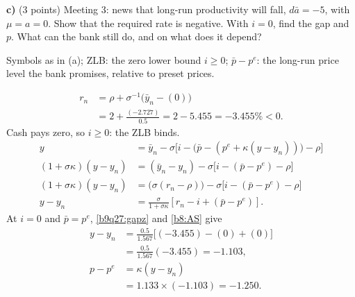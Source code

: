 \textbf{c)} (3 points) Meeting 3: news that long-run productivity will fall, $d\bar a=-5$, with $\mu=a=0$. Show that the required rate is
negative. With $i=0$, find the gap and $p$. What can the bank still do, and on what does it depend?
\resolespaco
\begin{sol}
\begin{notacao}
\item Symbols as in (a); ZLB: the zero lower bound $i\ge0$; $\bar p-p^e$: the long-run price level the bank promises, relative to preset prices.
\end{notacao}
\begin{align*}
r_n&=\rho+\sigma^{-1}\big(\bar y_n-(0)\big)\\
&=2+\frac{(-2.727)}{0.5}=2-5.455=-3.455\%<0 .
\end{align*}
Cash pays zero, so $i\ge0$: the ZLB binds.
\begin{align}
y&=\bar y_n-\sigma\big[i-\big(\bar p-(p^e+\kappa(y-y_n))\big)-\rho\big]\nonumber\\
(1+\sigma\kappa)(y-y_n)&=(\bar y_n-y_n)-\sigma\big[i-(\bar p-p^e)-\rho\big]\nonumber\\
(1+\sigma\kappa)(y-y_n)&=\big(\sigma(r_n-\rho)\big)-\sigma\big[i-(\bar p-p^e)-\rho\big]\nonumber\\
y-y_n&=\frac{\sigma}{1+\sigma\kappa}\left[r_n-i+(\bar p-p^e)\right]. \label{b9q27:gapz}
\end{align}
At $i=0$ and $\bar p=p^e$, \eqref{b9q27:gapz} and \eqref{b8:AS} give
\begin{align*}
y-y_n&=\frac{0.5}{1.567}\big[(-3.455)-(0)+(0)\big]\\
&=\frac{0.5}{1.567}(-3.455)=-1.103,\\
p-p^e&=\kappa(y-y_n)\\
&=1.133\times(-1.103)=-1.250 .
\end{align*}
\end{sol}

